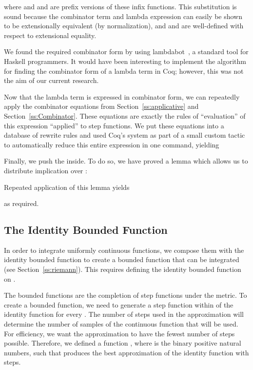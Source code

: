 \documentclass{elsarticle}
\newcommand{\tmtexttt}[1]{{\ttfamily{#1}}}
\begin{document}
where  and  and  are prefix versions of
these infix functions. This substitution is sound because the combinator term
and lambda expression can easily be shown to be extensionally equivalent (by
normalization), and  and  are
well-defined with respect to extensional equality.

We found the required combinator form by using
lambdabot~{\cite{lambdabot}}, a standard tool for
Haskell programmers. It would have been interesting to implement the algorithm
for finding the combinator form of a lambda term in Coq; however, this was not
the aim of our current research.

Now that the lambda term is expressed in combinator form, we can repeatedly
apply the combinator equations from Section~\ref{ss:applicative} and
Section~\ref{ss:Combinator}. These equations are exactly the rules of
``evaluation'' of this expression ``applied'' to step functions. We put these
equations into a database of rewrite rules and used Coq's
\tmtexttt{autorewrite} system as part of a small custom tactic to
automatically reduce this entire expression in one command, yielding

Finally, we push the  inside. To do so, we have
proved a lemma which allows us to distribute implication over
:

Repeated application of this lemma yields

as required.

\subsection{The Identity Bounded Function}\label{ss:id01}

In order to integrate uniformly continuous functions, we compose them with the
identity bounded function to create a bounded function that can be integrated
(see Section~\ref{ss:riemann}). This requires defining the identity bounded
function on .

The bounded functions are the completion of step functions under the
 metric. To create a bounded function, we need to generate a step
function within  of the identity function for every . The number of steps used in the approximation will determine
the number of samples of the continuous function  that will be used. For
efficiency, we want the approximation to have the fewest number of steps
possible. Therefore, we defined a function
, where
\tmtexttt{positive} is the binary positive natural numbers, such that
 produces the best approximation of the
identity function with  steps.
\end{document}

